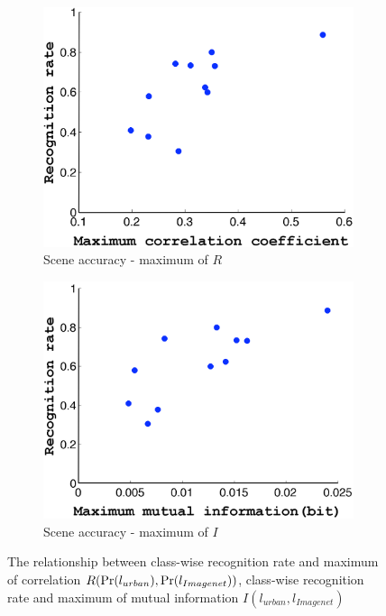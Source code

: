 \documentclass[10pt,twocolumn,letterpaper]{article}
\begin{document}
\begin{figure}[!t]
\begin{center}
\begin{subfigure}[b]{0.23\textwidth}
        \end{subfigure}
                \begin{subfigure}[b]{0.23\textwidth}
                \includegraphics[width=\textwidth]{accuracy_corr1.png}
                \caption{Scene accuracy - maximum of $R$}
                \label{sb3}
        \end{subfigure}
                \begin{subfigure}[b]{0.23\textwidth}
                \includegraphics[width=\textwidth]{accuracy_mutinf1.png}
                \caption{Scene accuracy - maximum of $I$}
                \label{sb4}
        \end{subfigure}
\end{center}
\caption{The relationship between class-wise recognition rate and maximum of correlation $R(\textup{Pr}(l_{urban}),\textup{Pr}(l_{Imagenet}))$, class-wise recognition rate and maximum of mutual information $I(l_{urban},l_{Imagenet})$}
\label{accuracy_correlation_mutu}
\end{figure}
\end{document}
